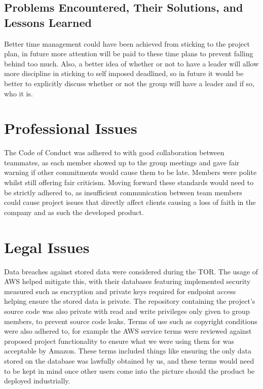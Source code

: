 \documentclass[]{report}
\begin{document}
	\subsection{Problems Encountered, Their Solutions, and Lessons Learned}
	Better time management could have been achieved from sticking to the project plan, in future more attention will be paid to these time plans to prevent falling behind too much. Also, a better idea of whether or not to have a leader will allow more discipline in sticking to self imposed deadlined, so in future it would be better to explicitly discuss whether or not the group will have a leader and if so, who it is.

\section{Professional Issues}
The Code of Conduct was adhered to with good collaboration between teammates, as each member showed up to the group meetings and gave fair warning if other commitments would cause them to be late. Members were polite whilst still offering fair criticism. Moving forward these standards would need to be strictly adhered to, as insufficient communication between team members could cause project issues that directly affect clients causing a loss of faith in the company and as such the developed product.

\section{Legal Issues}
Data breaches against stored data were considered during the TOR. The usage of AWS helped mitigate this, with their databases featuring implemented security measured\cite{awsdatabasedocs} such as encryption and private keys required for endpoint access helping ensure the stored data is private. The repository containing the project's source code was also private with read and write privileges only given to group members, to prevent source code leaks. Terms of use such as copyright conditions were also adhered to, for example the AWS service terms\cite{awsserviceterms} were reviewed against proposed project functionality to ensure what we were using them for was acceptable by Amazon. These terms included things like ensuring the only data stored on the database was lawfully obtained by us, and these terms would need to be kept in mind once other users come into the picture should the product be deployed industrially. 
\medskip
\end{document}

